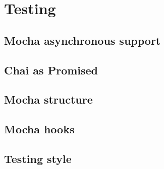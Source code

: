 \chapter{Testing} {

	\section{Mocha asynchronous support} {
	\label{app:mocha_asynchronous_support}
		
	}

	\section{Chai as Promised} {
	\label{app:chai_as_promised}
		
	}

	\section{Mocha structure} {
	\label{app:mocha_structure}
		
	}

	\section{Mocha hooks} {
	\label{app:mocha_hooks}
		
	}

	\section{Testing style} {
	\label{app:testing_style}
		
	}
	
}